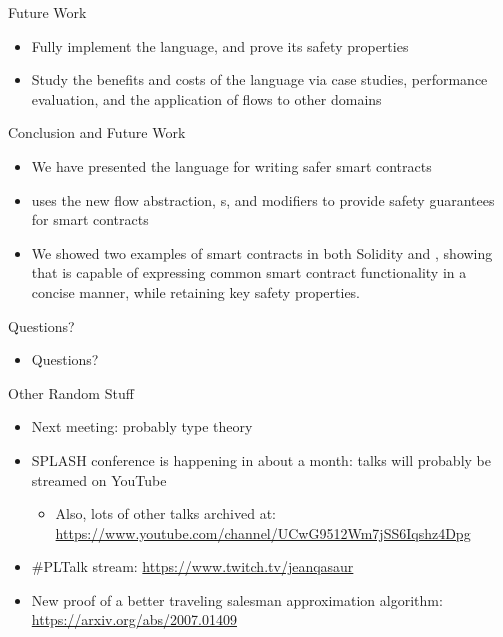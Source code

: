 \documentclass[leqno,presentation,usenames,dvipsnames]{beamer}
\begin{document}

\begin{frame}{Future Work}
    \begin{itemize}
        \item Fully implement the \langName language, and prove its safety properties
        \item Study the benefits and costs of the language via case studies, performance evaluation, and the application of flows to other domains
    \end{itemize}
\end{frame}

\begin{frame}{Conclusion and Future Work}
    \begin{itemize}
        \item We have presented the \langName language for writing safer smart contracts
        \item \langName uses the new flow abstraction, \assetTxt{}s, and modifiers to provide safety guarantees for smart contracts
        \item We showed two examples of smart contracts in both Solidity and \langName, showing that \langName is capable of expressing common smart contract functionality in a concise manner, while retaining key safety properties.
    \end{itemize}
\end{frame}

\begin{frame}{Questions?}
    \begin{itemize}
        \item Questions?
    \end{itemize}
\end{frame}

\begin{frame}[fragile]{Other Random Stuff}
    \begin{itemize}
        \item Next meeting: probably type theory
        \item SPLASH conference is happening in about a month: talks will probably be streamed on YouTube
            \begin{itemize}
                \item Also, lots of other talks archived at: \url{https://www.youtube.com/channel/UCwG9512Wm7jSS6Iqshz4Dpg}
            \end{itemize}
        \item \#PLTalk stream: \url{https://www.twitch.tv/jeanqasaur}
        \item New proof of a better traveling salesman approximation algorithm: \url{https://arxiv.org/abs/2007.01409}
    \end{itemize}
\end{frame}
\end{document}
